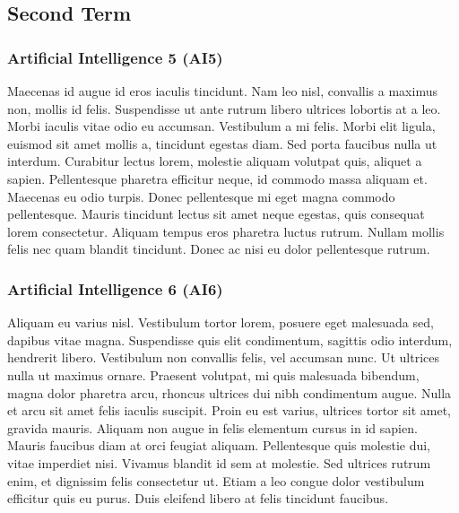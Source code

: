 \documentclass{article}
\begin{document}
\subsection{Second Term}


\subsubsection{Artificial Intelligence 5 (AI5)}

Maecenas id augue id eros iaculis tincidunt. Nam leo nisl, convallis a maximus non, mollis id felis. Suspendisse ut ante rutrum libero ultrices lobortis at a leo. Morbi iaculis vitae odio eu accumsan. Vestibulum a mi felis. Morbi elit ligula, euismod sit amet mollis a, tincidunt egestas diam. Sed porta faucibus nulla ut interdum. Curabitur lectus lorem, molestie aliquam volutpat quis, aliquet a sapien. Pellentesque pharetra efficitur neque, id commodo massa aliquam et. Maecenas eu odio turpis. Donec pellentesque mi eget magna commodo pellentesque. Mauris tincidunt lectus sit amet neque egestas, quis consequat lorem consectetur. Aliquam tempus eros pharetra luctus rutrum. Nullam mollis felis nec quam blandit tincidunt. Donec ac nisi eu dolor pellentesque rutrum. 

\subsubsection{Artificial Intelligence 6 (AI6)}

Aliquam eu varius nisl. Vestibulum tortor lorem, posuere eget malesuada sed, dapibus vitae magna. Suspendisse quis elit condimentum, sagittis odio interdum, hendrerit libero. Vestibulum non convallis felis, vel accumsan nunc. Ut ultrices nulla ut maximus ornare. Praesent volutpat, mi quis malesuada bibendum, magna dolor pharetra arcu, rhoncus ultrices dui nibh condimentum augue. Nulla et arcu sit amet felis iaculis suscipit. Proin eu est varius, ultrices tortor sit amet, gravida mauris. Aliquam non augue in felis elementum cursus in id sapien. Mauris faucibus diam at orci feugiat aliquam. Pellentesque quis molestie dui, vitae imperdiet nisi. Vivamus blandit id sem at molestie. Sed ultrices rutrum enim, et dignissim felis consectetur ut. Etiam a leo congue dolor vestibulum efficitur quis eu purus. Duis eleifend libero at felis tincidunt faucibus. 

% 
% 
\end{document}
